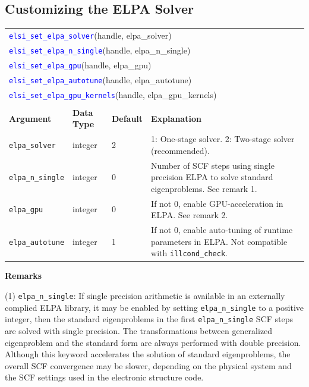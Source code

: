 \documentclass{report}
\newcommand{\api}[1]{\textcolor{blue}{\texttt{#1}}}
\begin{document}
\subsection{Customizing the ELPA Solver}
\label{subsec:setter_elpa}
\begin{tabular}[]{|p{30mm}|p{20mm}|p{15mm}|p{97mm}|}
\multicolumn{4}{l}{\api{elsi\_set\_elpa\_solver}(handle, elpa\_solver)}\\
\multicolumn{4}{l}{\api{elsi\_set\_elpa\_n\_single}(handle, elpa\_n\_single)}\\
\multicolumn{4}{l}{\api{elsi\_set\_elpa\_gpu}(handle, elpa\_gpu)}\\
\multicolumn{4}{l}{\api{elsi\_set\_elpa\_autotune}(handle, elpa\_autotune)}\\
\multicolumn{4}{l}{\api{elsi\_set\_elpa\_gpu\_kernels}(handle, elpa\_gpu\_kernels)}\\
\multicolumn{4}{l}{}\\
\hline
\multicolumn{1}{|l|}{\textbf{Argument}} & \multicolumn{1}{l|}{\textbf{Data Type}} & \multicolumn{1}{l|}{\textbf{Default}} & \multicolumn{1}{l|}{\textbf{Explanation}}\\
\hline
\texttt{elpa\_solver}       & integer & 2 & 1: One-stage solver. 2: Two-stage solver (recommended).\\
\hline
\texttt{elpa\_n\_single}    & integer & 0 & Number of SCF steps using single precision ELPA to solve standard eigenproblems. See remark 1.\\
\hline
\texttt{elpa\_gpu}          & integer & 0 & If not 0, enable GPU-acceleration in ELPA. See remark 2.\\
\hline
\texttt{elpa\_autotune}     & integer & 1 & If not 0, enable auto-tuning of runtime parameters in ELPA. Not compatible with \texttt{illcond\_check}.\\
\hline
\end{tabular}

\textbf{Remarks}

(1) \texttt{elpa\_n\_single}: If single precision arithmetic is available in an externally complied ELPA library, it may be enabled by setting \texttt{elpa\_n\_single} to a positive integer, then the standard eigenproblems in the first \texttt{elpa\_n\_single} SCF steps are solved with single precision. The transformations between generalized eigenproblem and the standard form are always performed with double precision. Although this keyword accelerates the solution of standard eigenproblems, the overall SCF convergence may be slower, depending on the physical system and the SCF settings used in the electronic structure code.
\end{document}
